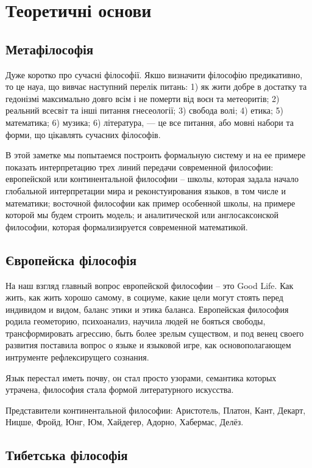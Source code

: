 \section{Теоретичні основи}

\subsection{Метафілософія}

Дуже коротко про сучасні філософії. Якшо визначити філософію предикативно, то це
науа, що вивчає наступний перелік питань: 1) як жити добре в достатку та гедонізмі
максимально довго всім і не померти від воєн та метеоритів; 2) реальний всесвіт
та інші питання гнесеології; 3) свобода волі; 4) етика; 5) математика; 6) музика; 6) література,
--- це все питання, або мовні набори та форми, що цікавлять сучасних філософів.

В этой заметке мы попытаемся построить формальную систему и на ее примере показать интерпретацию трех линий передачи современной философии: европейской или континентальной философии -- школы, которая задала начало глобальной интерпретации мира и реконстуирования языков, в том числе и математики; восточной философии как пример особенной школы, на примере которой мы будем строить модель; и аналитической или англосаксонской философии, которая формализируется современной математикой.

\subsection{Європейска філософія}

На наш взгляд главный вопрос европейской философии -- это Good Life. Как жить, как жить хорошо самому, в социуме, какие цели могут стоять перед индивидом и видом, баланс этики и этика баланса. Европейская философия родила геометорию, психоанализ, научила людей не бояться свободы, трансформировать агрессию, быть более зрелым существом, и под венец своего развития поставила вопрос о языке и языковой игре, как основополагающем интрументе рефлексирущего сознания.

Язык перестал иметь почву, он стал просто узорами, семантика которых утрачена, философия стала формой литературного искусства.

Представители континентальной философии: Аристотель, Платон, Кант, Декарт, Ницше, Фройд, Юнг, Юм, Хайдегер, Адорно, Хабермас, Делёз.

\subsection{Тибетська філософія}

